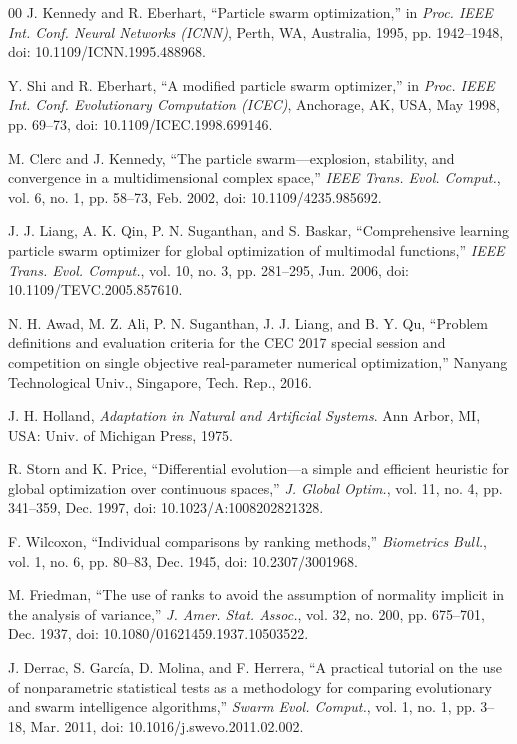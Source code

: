 \documentclass[conference]{IEEEtran}
\begin{document}
\begin{thebibliography}{00}
     J. Kennedy and R. Eberhart, ``Particle swarm optimization,'' in \textit{Proc. IEEE Int. Conf. Neural Networks (ICNN)}, Perth, WA, Australia, 1995, pp. 1942--1948, doi: 10.1109/ICNN.1995.488968.

     Y. Shi and R. Eberhart, ``A modified particle swarm optimizer,'' in \textit{Proc. IEEE Int. Conf. Evolutionary Computation (ICEC)}, Anchorage, AK, USA, May 1998, pp. 69--73, doi: 10.1109/ICEC.1998.699146.

     M. Clerc and J. Kennedy, ``The particle swarm---explosion, stability, and convergence in a multidimensional complex space,'' \textit{IEEE Trans. Evol. Comput.}, vol. 6, no. 1, pp. 58--73, Feb. 2002, doi: 10.1109/4235.985692.

     J. J. Liang, A. K. Qin, P. N. Suganthan, and S. Baskar, ``Comprehensive learning particle swarm optimizer for global optimization of multimodal functions,'' \textit{IEEE Trans. Evol. Comput.}, vol. 10, no. 3, pp. 281--295, Jun. 2006, doi: 10.1109/TEVC.2005.857610.

     N. H. Awad, M. Z. Ali, P. N. Suganthan, J. J. Liang, and B. Y. Qu, ``Problem definitions and evaluation criteria for the CEC 2017 special session and competition on single objective real-parameter numerical optimization,'' Nanyang Technological Univ., Singapore, Tech. Rep., 2016.

     J. H. Holland, \textit{Adaptation in Natural and Artificial Systems}. Ann Arbor, MI, USA: Univ. of Michigan Press, 1975.

     R. Storn and K. Price, ``Differential evolution---a simple and efficient heuristic for global optimization over continuous spaces,'' \textit{J. Global Optim.}, vol. 11, no. 4, pp. 341--359, Dec. 1997, doi: 10.1023/A:1008202821328.

     F. Wilcoxon, ``Individual comparisons by ranking methods,'' \textit{Biometrics Bull.}, vol. 1, no. 6, pp. 80--83, Dec. 1945, doi: 10.2307/3001968.

     M. Friedman, ``The use of ranks to avoid the assumption of normality implicit in the analysis of variance,'' \textit{J. Amer. Stat. Assoc.}, vol. 32, no. 200, pp. 675--701, Dec. 1937, doi: 10.1080/01621459.1937.10503522.

     J. Derrac, S. Garc\'{i}a, D. Molina, and F. Herrera, ``A practical tutorial on the use of nonparametric statistical tests as a methodology for comparing evolutionary and swarm intelligence algorithms,'' \textit{Swarm Evol. Comput.}, vol. 1, no. 1, pp. 3--18, Mar. 2011, doi: 10.1016/j.swevo.2011.02.002.


\end{thebibliography}
\end{document}
